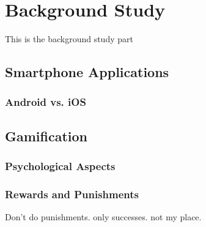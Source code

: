 
\chapter{Background Study}
\label{chap:litReview}
This is the background study part




\section{Smartphone Applications}

\subsection{Android vs. iOS}

\subsection{}

\section{Gamification}

\subsection{Psychological Aspects}

\subsection{Rewards and Punishments}
Don't do punishments. only successes. not my place.

